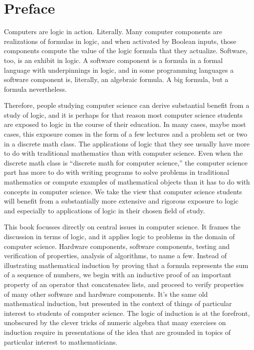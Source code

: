\chapter{Preface}
\label{ch:Preface}

Computers are logic in action. Literally.
Many computer components are realizations of formulas in logic,
and when activated by Boolean inputs, those components
compute the value of the logic formula that they actualize.
Software, too, is an exhibit in logic.
A software component is a formula in a formal language
with underpinnings in logic,
and in some programming languages a software component
is, literally, an algebraic formula.
A big formula, but a formula nevertheless.

Therefore, people studying computer science
can derive substantial benefit from a study of logic,
and it is perhaps for that reason most computer science students 
are exposed to logic in the course of their education.
In many cases, maybe most cases, this exposure comes
in the form of a few lectures and a problem set or two
in a discrete math class. The applications of logic that
they see usually have more to do with traditional mathematics
than with computer science. Even when the discrete math class
is ``discrete math for computer science,'' the computer science
part has more to do with writing programs to solve problems
in traditional mathematics or compute examples of
mathematical objects than it has to do with
concepts in computer science.
We take the view that computer science students will
benefit from a substantially more extensive and rigorous
exposure to logic and especially to applications of
logic in their chosen field of study.

This book focusses directly on central issues
in computer science.
It frames the discussion in terms of logic,
and it applies logic to problems in the domain of computer science.
Hardware components, software components,
testing and verification of properties, analysis of algorithms,
to name a few.
Instead of illustrating mathematical induction by  proving
that a formula represents the sum of a sequence of numbers,
we begin with an inductive proof of an important property of an operator
that concatenates lists, and proceed to verify properties of
many other software and hardware components.
It's the same old mathematical induction, but presented
in the context of things of particular interest to
students of computer science.
The logic of induction is at the forefront, 
unobscured by the clever tricks of numeric algebra
that many exercises on induction require in
presentations of the idea that are grounded in topics
of particular interest to mathematicians.

